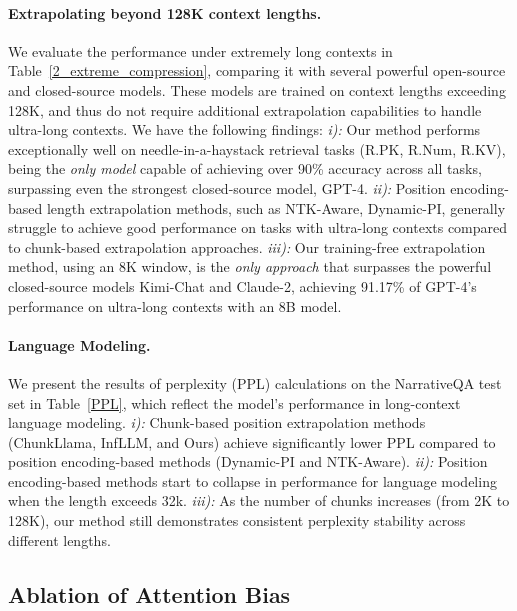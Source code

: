 \vspace{-2mm}
\paragraph{Extrapolating beyond 128K context lengths.}
We evaluate the performance under extremely long contexts in Table~\ref{2_extreme_compression}, comparing it with several powerful open-source and closed-source models. These models are trained on context lengths exceeding 128K, and thus do not require additional extrapolation capabilities to handle ultra-long contexts. We have the following findings: \textit{i):} Our method performs exceptionally well on needle-in-a-haystack retrieval tasks (R.PK, R.Num, R.KV), being the \textit{only model} capable of achieving over 90\% accuracy across all tasks, surpassing even the strongest closed-source model, GPT-4. \textit{ii):} Position encoding-based length extrapolation methods, such as NTK-Aware, Dynamic-PI, generally struggle to achieve good performance on tasks with ultra-long contexts compared to chunk-based extrapolation approaches. \textit{iii):} Our training-free extrapolation method, using an 8K window, is the \textit{only approach} that surpasses the powerful closed-source models Kimi-Chat and Claude-2, achieving 91.17\% of GPT-4's performance on ultra-long contexts with an 8B model.
\vspace{-2mm}
\paragraph{Language Modeling.} We present the results of perplexity (PPL) calculations on the NarrativeQA test set in Table~\ref{PPL}, which reflect the model's performance in long-context language modeling. \textit{i):} Chunk-based position extrapolation methods (ChunkLlama, InfLLM, and Ours) achieve significantly lower PPL compared to position encoding-based methods (Dynamic-PI and NTK-Aware). \textit{ii):} Position encoding-based methods start to collapse in performance for language modeling when the length exceeds 32k. \textit{iii):} As the number of chunks increases (from 2K to 128K), our method still demonstrates consistent perplexity stability across different lengths.

\subsection{Ablation of Attention Bias}
\label{Attention_Bias}

